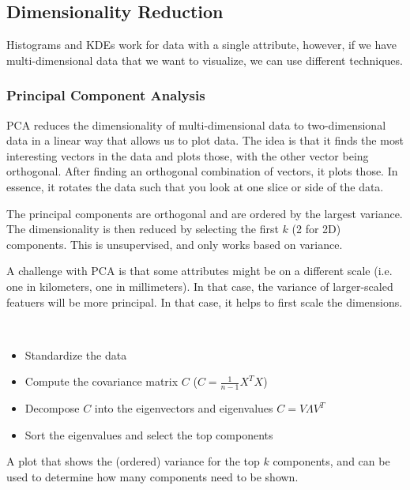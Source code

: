 \subsection{Dimensionality Reduction}

Histograms and KDEs work for data with a single attribute,
however, if we have multi-dimensional data that we
want to visualize, we can use different techniques.

\subsubsection{Principal Component Analysis}

PCA reduces the dimensionality of multi-dimensional data
to two-dimensional data in a linear way that allows us to
plot data. The idea is that it finds the most interesting
vectors in the data and plots those, with the other vector
being orthogonal. After finding an orthogonal combination of
vectors, it plots those. In essence, it rotates the data such
that you look at one slice or side of the data.

The principal components are orthogonal and are ordered by the
largest variance. The dimensionality is then reduced by selecting
the first $k$ (2 for 2D) components. This is unsupervised, and
only works based on variance.

A challenge with PCA is that some attributes might be on a different
scale (i.e. one in kilometers, one in millimeters). In that case,
the variance of larger-scaled featuers will be more principal.
In that case, it helps to first scale the dimensions.

\begin{definition}
  ~
  \begin{itemize}
    \item Standardize the data
    \item Compute the covariance matrix $C$ ($C = \frac{1}{n - 1}X^TX$)
    \item Decompose $C$ into the eigenvectors and eigenvalues $C = V
      \Lambda V^T$
    \item Sort the eigenvalues and select the top components
  \end{itemize}
\end{definition}

\begin{definition}
  A plot that shows the (ordered) variance for the top $k$ components,
  and can be used to determine how many components need to be shown.
\end{definition}

